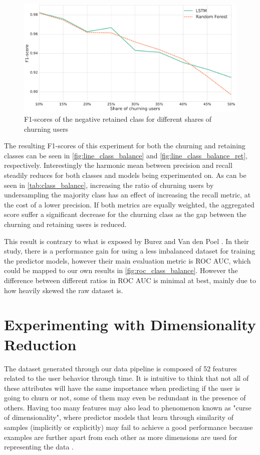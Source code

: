 \documentclass{kththesis}
\begin{document}
\begin{figure}
    \centering
    \includegraphics[width=1.0\textwidth,keepaspectratio]{figures/line_class_balance_retained.pdf}
    \caption{F1-scores of the negative retained class for different shares of churning users}
    \label{fig:line_class_balance_ret}
\end{figure}

The resulting F1-scores of this experiment for both the churning and retaining classes can be seen in \autoref{fig:line_class_balance} and \autoref{fig:line_class_balance_ret}, respectively. Interestingly the harmonic mean between precision and recall steadily reduces for both classes and models being experimented on. As can be seen in \autoref{tab:class_balance}, increasing the ratio of churning users by undersampling the majority class has an effect of increasing the recall metric, at the cost of a lower precision. If both metrics are equally weighted, the aggregated score suffer a significant decrease for the churning class as the gap between the churning and retaining users is reduced. 

This result is contrary to what is exposed by Burez and Van den Poel \citep{Burez2009}. In their study, there is a performance gain for using a less imbalanced dataset for training the predictor models,  however their main evaluation metric is ROC AUC, which could be mapped to our own results in \autoref{fig:roc_class_balance}. However the difference between different ratios in ROC AUC is minimal at best, mainly due to how heavily skewed the raw dataset is. 

\section{Experimenting with Dimensionality Reduction}

The dataset generated through our data pipeline is composed of 52 features related to the user behavior through time. It is intuitive to think that not all of these attributes will have the same importance when predicting if the user is going to churn or not, some of them may even be redundant in the presence of others. Having too many features may also lead to phenomenon known as "curse of dimensionality", where predictor models that learn through similarity of samples (implicitly or explicitly) may fail to achieve a good performance because examples are further apart from each other as more dimensions are used for representing the data \citep{domingos2012few}. 
\end{document}
